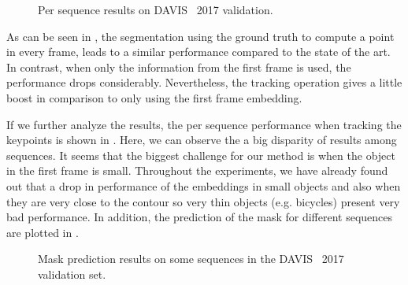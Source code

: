 \begin{figure}[H]
  \centering
  
  \caption{Per sequence results on DAVIS~\davislast{} 2017 validation. }
  \label{fig:experiments:videosegmentation:persequencemiou}
\end{figure}

As can be seen in , the segmentation using the ground truth to compute a point in every frame, leads to a similar performance compared to the state of the art.
In contrast, when only the information from the first frame is used, the performance drops considerably.
Nevertheless, the tracking operation gives a little boost in comparison to only using the first frame embedding.

If we further analyze the results, the per sequence performance when tracking the keypoints is shown in .
Here, we can observe the a big disparity of results among sequences.
It seems that the biggest challenge for our method is when the object in the first frame is small.
Throughout the experiments, we have already found out that a drop in performance of the embeddings in small objects and also when they are very close to the contour so very thin objects (e.g. bicycles) present very bad performance.
In addition, the prediction of the mask for different sequences are plotted in .

\begin{figure}[ht]
  \centering
  \caption{Mask prediction results on some sequences in the DAVIS~\davislast{} 2017 validation set. }
  \label{fig:experiments:videosegmentation:predmasksdavis}
\end{figure}
